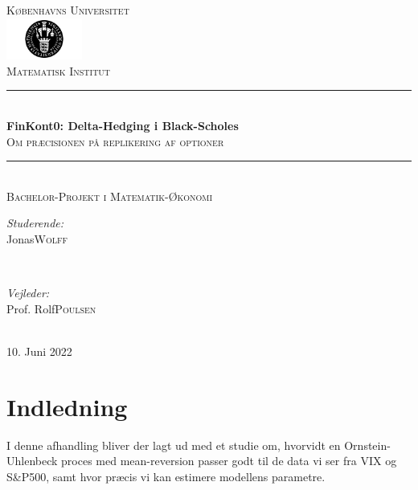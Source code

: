 \documentclass{article}
\title{\thesistitle}
\author{\thesisauthorfirst\space\thesisauthorsecond}
\date{\thesisdate}
\def\thesistitle{FinKont0: Delta-Hedging i Black-Scholes}
\def\thesissubtitle{Om præcisionen på replikering af optioner}
\def\thesisauthorfirst{Jonas}
\def\thesisauthorsecond{Wolff}
\def\thesissupervisorfirst{Prof. Rolf}
\def\thesissupervisorsecond{Poulsen}
\def\thesissecondreaderfirst{Prof. Anders}
\def\thesissecondreadersecond{And}
\def\thesisdate{10. Juni 2022}
\theoremstyle{definition}
\theoremstyle{remark}
\begin{document}
\begin{titlepage}
	\thispagestyle{empty}
	\newcommand{\HRule}{\rule{\linewidth}{0.5mm}}
	\center
	\textsc{\Large Københavns Universitet}\\[.7cm]
	\includegraphics[width=25mm]{img/ku_segl.png}\\[.5cm]
	\textsc{Matematisk Institut}\\[0.5cm]
	
	\HRule \\[0.4cm]
	{ \huge \bfseries \thesistitle}\\[0.1cm]
	\textsc{\thesissubtitle}\\
	\HRule \\[.5cm]
	\textsc{\large Bachelor-Projekt i Matematik-Økonomi}\\[.5cm]
	
	\begin{minipage}{0.4\textwidth}
	\begin{flushleft} \large
	\emph{Studerende:}\\
	\thesisauthorfirst\space \textsc{\thesisauthorsecond}
	\end{flushleft}
	\end{minipage}
	~
	\begin{minipage}{0.4\textwidth}
	\begin{flushright} \large
	\emph{Vejleder:} \\
	\thesissupervisorfirst\space \textsc{\thesissupervisorsecond} \\[1em]
	\end{flushright}
	\end{minipage}\\[4cm]
	\vfill
	{\large \thesisdate}\\
	\clearpage
\end{titlepage}

\tableofcontents

\newpage
\setcounter{section}{-1}
\section{Indledning}
I denne afhandling bliver der lagt ud med et studie om, hvorvidt en Ornstein-Uhlenbeck proces med mean-reversion passer godt til de data vi ser fra VIX og S\&P500, samt hvor præcis vi kan estimere modellens parametre.
\end{document}
